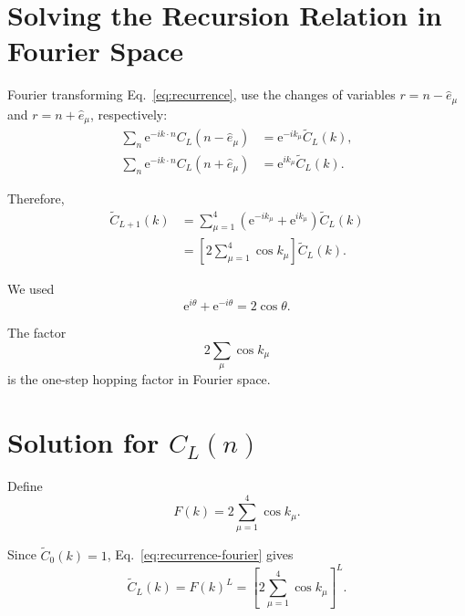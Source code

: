 \documentclass[11pt,a4paper,oneside]{article}
\newcommand{\ee}{\mathrm{e}}
\begin{document}
	
	\section{Solving the Recursion Relation in Fourier Space}
	
	Fourier transforming Eq.~\eqref{eq:recurrence}, use the changes of variables
	$r=n-\hat e_\mu$ and $r=n+\hat e_\mu$, respectively:
	\begin{align}
		\sum_n
		\ee^{-ik\cdot n}C_L(n-\hat e_\mu)
		&=
		\ee^{-ik_\mu}\widetilde C_L(k),
		\\
		\sum_n
		\ee^{-ik\cdot n}C_L(n+\hat e_\mu)
		&=
		\ee^{ik_\mu}\widetilde C_L(k).
	\end{align}
	
	Therefore,
	\begin{align}
		\widetilde C_{L+1}(k)
		&=
		\sum_{\mu=1}^{4}
		\left(
		\ee^{-ik_\mu}
		+
		\ee^{ik_\mu}
		\right)
		\widetilde C_L(k)
		\\
		&=
		\left[
		2\sum_{\mu=1}^{4}\cos k_\mu
		\right]
		\widetilde C_L(k).
		\label{eq:recurrence-fourier}
	\end{align}
	
	We used
	\[
	\ee^{i\theta}+\ee^{-i\theta}=2\cos\theta.
	\]
	
	The factor
	\[
	2\sum_\mu\cos k_\mu
	\]
	is the one-step hopping factor in Fourier space.
	
	
	\section{Solution for $C_L(n)$}
	
	Define
	\begin{equation}
		F(k)
		=
		2\sum_{\mu=1}^{4}\cos k_\mu.
	\end{equation}
	
	Since $\widetilde C_0(k)=1$, Eq.~\eqref{eq:recurrence-fourier} gives
	\begin{equation}
		\boxed{
			\widetilde C_L(k)
			=
			F(k)^L
			=
			\left[
			2\sum_{\mu=1}^{4}\cos k_\mu
			\right]^L.
		}
		\label{eq:CLtilde-solution}
	\end{equation}
	
\end{document}
